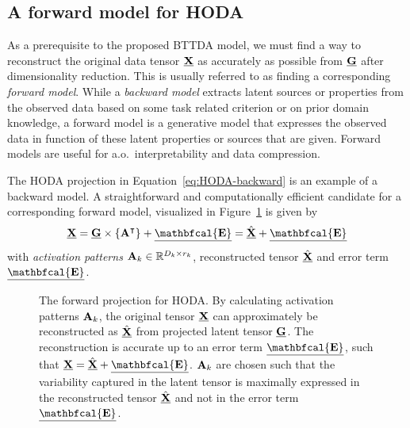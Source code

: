 \subsection{A forward model for HODA}
As a prerequisite to the proposed BTTDA model, we must find a
way to reconstruct the original data tensor $\underline{\mathbf{X}}$ as accurately as possible
from $\underline{\mathbf{G}}$ after dimensionality reduction.
This is usually referred to as finding a corresponding \emph{forward model}.
While a \emph{backward model} extracts latent sources or properties from the observed
data based on some task related criterion or on prior domain knowledge,
a forward model is a generative model that expresses the observed data in
function of these latent properties or sources that are given.
Forward models are useful for a.o.\ interpretability and data compression.

The HODA projection in Equation~\ref{eq:HODA-backward} is an example
of a backward model.
A straightforward and computationally efficient candidate for a corresponding
forward model, visualized in Figure~\ref{fig:HODA-forward} is given by
\begin{equation}
  \ten{X} = \ten{G}\mmpr{\mat{A}^\intercal} + \ten{\mathbfcal{E}} =
  \hat{\ten{X}} + \ten{\mathbfcal{E}}
	\label{eq:HODA-forward}
\end{equation}
with \emph{activation patterns} $\mathbf{A}_k \in \mathbb{R}^{D_k\times r_k}$,
reconstructed tensor $\hat{\underline{\mathbf{X}}}$ and error term $\ten{\mathbfcal{E}}$.
\begin{figure}[t]
	\centering
	
  \caption[The \ac{hoda} forward projection.]{The forward projection for HODA.
    By calculating activation	patterns $\mathbf{A}_k$, the original tensor $\underline{\mathbf{X}}$ can approximately be
    reconstructed as $\hat{\underline{\mathbf{X}}}$ from projected latent tensor $\underline{\mathbf{G}}$.
    The reconstruction is accurate up to an error term $\ten{\mathbfcal{E}}$,
    such that $\ten{X}=\hat{\ten{X}}+\ten{\mathbfcal{E}}$.
    $\mathbf{A}_k$ are chosen such that the variability captured in the latent tensor is
    maximally expressed in the reconstructed tensor $\hat{\underline{\mathbf{X}}}$ and not in
    the error term $\ten{\mathbfcal{E}}$.}
	\label{fig:HODA-forward}
\end{figure}

